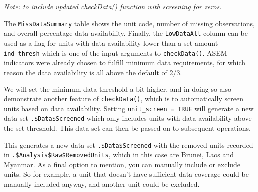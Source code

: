 \documentclass[
]{book}
\newenvironment{Shaded}{\begin{snugshade}}{\end{snugshade}}
\newcommand{\CommentTok}[1]{\textcolor[rgb]{0.56,0.35,0.01}{\textit{#1}}}
\newcommand{\DataTypeTok}[1]{\textcolor[rgb]{0.13,0.29,0.53}{#1}}
\newcommand{\FloatTok}[1]{\textcolor[rgb]{0.00,0.00,0.81}{#1}}
\newcommand{\KeywordTok}[1]{\textcolor[rgb]{0.13,0.29,0.53}{\textbf{#1}}}
\newcommand{\NormalTok}[1]{#1}
\newcommand{\OperatorTok}[1]{\textcolor[rgb]{0.81,0.36,0.00}{\textbf{#1}}}
\newcommand{\OtherTok}[1]{\textcolor[rgb]{0.56,0.35,0.01}{#1}}
\newcommand{\StringTok}[1]{\textcolor[rgb]{0.31,0.60,0.02}{#1}}
\begin{document}
\emph{Note: to include updated checkData() function with screening for zeros.}

The \texttt{MissDataSummary} table shows the unit code, number of missing observations, and overall percentage data availability. Finally, the \texttt{LowDataAll} column can be used as a flag for units with data availability lower than a set amount \texttt{ind\_thresh} which is one of the input arguments to \texttt{checkData()}. ASEM indicators were already chosen to fulfill minimum data requirements, for which reason the data availability is all above the default of 2/3.

We will set the minimum data threshold a bit higher, and in doing so also demonstrate another feature of \texttt{checkData()}, which is to automatically screen units based on data availability. Setting \texttt{unit\_screen\ =\ TRUE} will generate a new data set \texttt{.\$Data\$Screened} which only includes units with data availability above the set threshold. This data set can then be passed on to subsequent operations.

\begin{Shaded}
\end{Shaded}

This generates a new data set \texttt{.\$Data\$Screened} with the removed units recorded in \texttt{.\$Analysis\$Raw\$RemovedUnits}, which in this case are Brunei, Laos and Myanmar. As a final option to mention, you can manually include or exclude units. So for example, a unit that doesn't have sufficient data coverage could be manually included anyway, and another unit could be excluded.

\begin{Shaded}
\end{Shaded}
\end{document}
